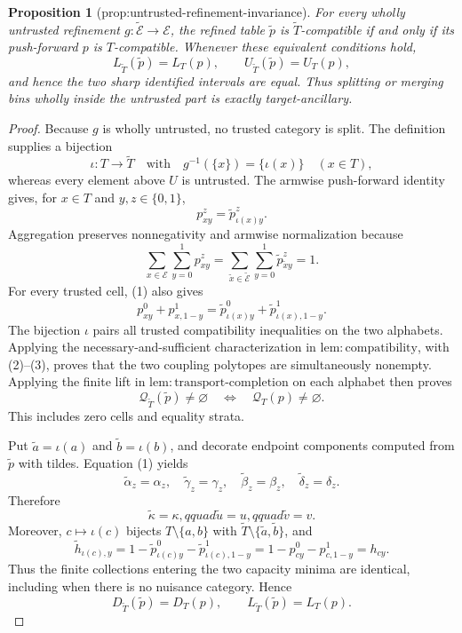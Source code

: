 \documentclass{article}
\newtheorem{proposition}{Proposition}
\begin{document}
\begin{proposition}[prop:untrusted-refinement-invariance]\label{prop:untrusted-refinement-invariance}
For every wholly untrusted refinement \(g:\widetilde{\mathcal E}\to\mathcal E\), the refined table \(\widetilde p\) is \(\widetilde T\)-compatible if and only if its push-forward \(p\) is \(T\)-compatible.  Whenever these equivalent conditions hold,
\[
 L_{\widetilde T}(\widetilde p)=L_T(p),\qquad
 U_{\widetilde T}(\widetilde p)=U_T(p),
\]
and hence the two sharp identified intervals are equal.  Thus splitting or merging bins wholly inside the untrusted part is exactly target-ancillary.
\end{proposition}
\begin{proof}
Because \(g\) is wholly untrusted, no trusted category is split.  The
definition supplies a bijection
\[
 \iota:T\longrightarrow\widetilde T
 \quad\text{with}\quad
 g^{-1}(\{x\})=\{\iota(x)\}\quad(x\in T),
\]
whereas every element above \(U\) is untrusted.  The armwise push-forward
identity gives, for \(x\in T\) and \(y,z\in\{0,1\}\),
\[
 p^z_{xy}=\widetilde p^z_{\iota(x)y}. \tag{1}
\]
Aggregation preserves nonnegativity and armwise normalization because
\[
 \sum_{x\in\mathcal E}\sum_{y=0}^1p^z_{xy}
 =\sum_{\widetilde x\in\widetilde{\mathcal E}}
   \sum_{y=0}^1\widetilde p^z_{\widetilde x y}=1. \tag{2}
\]
For every trusted cell, (1) also gives
\[
 p^0_{xy}+p^1_{x,1-y}
 =\widetilde p^0_{\iota(x)y}
  +\widetilde p^1_{\iota(x),1-y}. \tag{3}
\]
The bijection \(\iota\) pairs all trusted compatibility inequalities on the
two alphabets.  Applying the necessary-and-sufficient characterization in
\(\mathrm{lem{:}compatibility}\), with (2)--(3), proves that the two
coupling polytopes are simultaneously nonempty.  Applying the finite lift
in \(\mathrm{lem{:}transport\mbox{-}completion}\) on each alphabet then
proves
\[
 \mathcal Q_{\widetilde T}(\widetilde p)\ne\varnothing
 \quad\Longleftrightarrow\quad
 \mathcal Q_T(p)\ne\varnothing. \tag{4}
\]
This includes zero cells and equality strata.

Put \(\widetilde a=\iota(a)\) and \(\widetilde b=\iota(b)\), and decorate
endpoint components computed from \(\widetilde p\) with tildes.  Equation
(1) yields
\[
 \widetilde\alpha_z=\alpha_z,
 \quad \widetilde\gamma_z=\gamma_z,
 \quad \widetilde\beta_z=\beta_z,
 \quad \widetilde\delta_z=\delta_z.
\]
Therefore
\[
 \widetilde\kappa=\kappa,qquad
 \widetilde u=u,qquad
 \widetilde v=v. \tag{5}
\]
Moreover, \(c\mapsto\iota(c)\) bijects
\(T\setminus\{a,b\}\) with
\(\widetilde T\setminus\{\widetilde a,\widetilde b\}\), and
\[
 \widetilde h_{\iota(c),y}
 =1-\widetilde p^0_{\iota(c)y}
    -\widetilde p^1_{\iota(c),1-y}
 =1-p^0_{cy}-p^1_{c,1-y}=h_{cy}. \tag{6}
\]
Thus the finite collections entering the two capacity minima are identical,
including when there is no nuisance category.  Hence
\[
 D_{\widetilde T}(\widetilde p)=D_T(p),
 \qquad
 L_{\widetilde T}(\widetilde p)=L_T(p). \tag{7}
\]


\end{proof}
\end{document}
